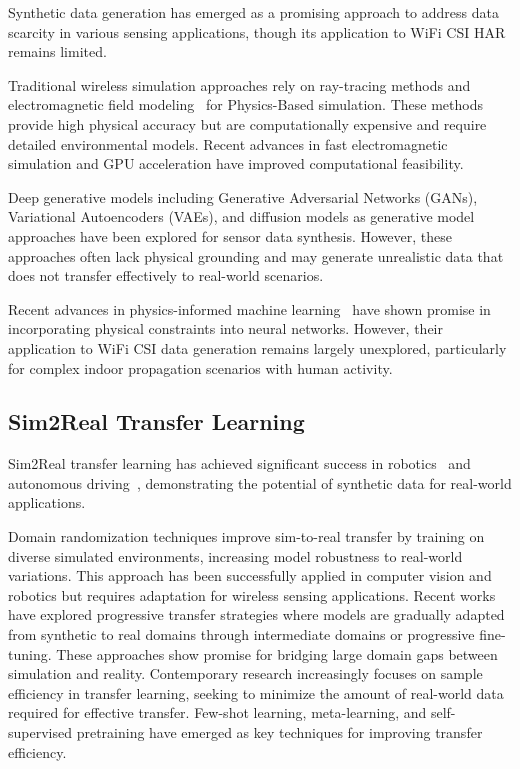 \documentclass[journal]{IEEEtran}
\begin{document}
Synthetic data generation has emerged as a promising approach to address data scarcity in various sensing applications, though its application to WiFi CSI HAR remains limited.

Traditional wireless simulation approaches rely on ray-tracing methods and electromagnetic field modeling~\cite{ray_tracing_wireless2000} for Physics-Based simulation. These methods provide high physical accuracy but are computationally expensive and require detailed environmental models. Recent advances in fast electromagnetic simulation and GPU acceleration have improved computational feasibility.

Deep generative models including Generative Adversarial Networks (GANs), Variational Autoencoders (VAEs), and diffusion models as generative model approaches have been explored for sensor data synthesis. However, these approaches often lack physical grounding and may generate unrealistic data that does not transfer effectively to real-world scenarios.

Recent advances in physics-informed machine learning~\cite{pinn_karniadakis2021} have shown promise in incorporating physical constraints into neural networks. However, their application to WiFi CSI data generation remains largely unexplored, particularly for complex indoor propagation scenarios with human activity.

\subsection{Sim2Real Transfer Learning}

Sim2Real transfer learning has achieved significant success in robotics~\cite{sim2real_robotics2017} and autonomous driving~\cite{sim2real_autonomous2019}, demonstrating the potential of synthetic data for real-world applications.

Domain randomization techniques improve sim-to-real transfer by training on diverse simulated environments, increasing model robustness to real-world variations. This approach has been successfully applied in computer vision and robotics but requires adaptation for wireless sensing applications.
Recent works have explored progressive transfer strategies where models are gradually adapted from synthetic to real domains through intermediate domains or progressive fine-tuning. These approaches show promise for bridging large domain gaps between simulation and reality.
Contemporary research increasingly focuses on sample efficiency in transfer learning, seeking to minimize the amount of real-world data required for effective transfer. Few-shot learning, meta-learning, and self-supervised pretraining have emerged as key techniques for improving transfer efficiency.
\end{document}
